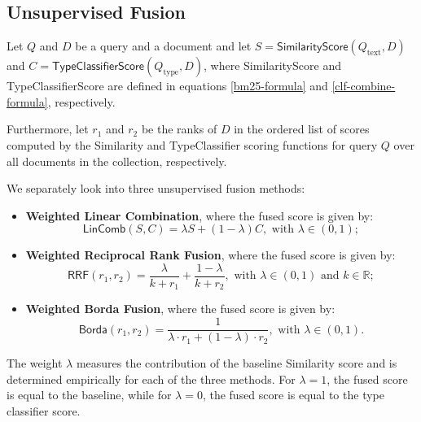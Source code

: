 \subsection{Unsupervised Fusion}
Let $Q$ and $D$ be a query and a document and let $S=\textsf{SimilarityScore}(Q_{\text{text}}, D)$
and $C=\textsf{TypeClassifierScore}(Q_{\text{type}}, D)$, where \textsf{SimilarityScore} and \textsf{TypeClassifierScore}
are defined in equations \ref{bm25-formula} and \ref{clf-combine-formula}, respectively.

Furthermore, let $r_1$ and $r_2$ be the ranks of $D$ in the ordered list of scores computed by the
\textsf{Similarity} and \textsf{TypeClassifier} scoring functions for query $Q$ over all documents in the collection,
respectively.

We separately look into three unsupervised fusion methods:
\begin{itemize}

 \item \textbf{Weighted Linear Combination}, where the fused score is given by: 
 \begin{equation} \label{interp-formula}
 \textsf{LinComb}(S, C) = \lambda S + (1-\lambda) C, \text{ with } \lambda \in (0,1);
 \end{equation}

\item \textbf{Weighted Reciprocal Rank Fusion}, where the fused score is given by:
 \begin{equation}\label{rrf-formula}
  \textsf{RRF}(r_1, r_2) =  \displaystyle\frac{\lambda}{k + r_1} + \displaystyle\frac{1- \lambda}{k + r_2},  \text{ with } \lambda \in (0,1)
  \text{ and } k\in\mathbb{R};
 \end{equation}
 
 \item \textbf{Weighted Borda Fusion},  where the fused score is given by:
 \begin{equation}\label{borda-formula}
   \textsf{Borda}(r_1, r_2) =  \displaystyle\frac{1}{\lambda \cdot r_1 + (1-\lambda)\cdot r_2},  \text{ with } \lambda \in (0,1).
 \end{equation}
  \end{itemize}

The weight $\lambda$ measures the contribution of the baseline \textsf{Similarity} score and
is determined empirically for each of the three methods. For $\lambda=1$, the fused score is equal to the baseline,
while for $\lambda=0$, the fused score is equal to the type classifier score.

